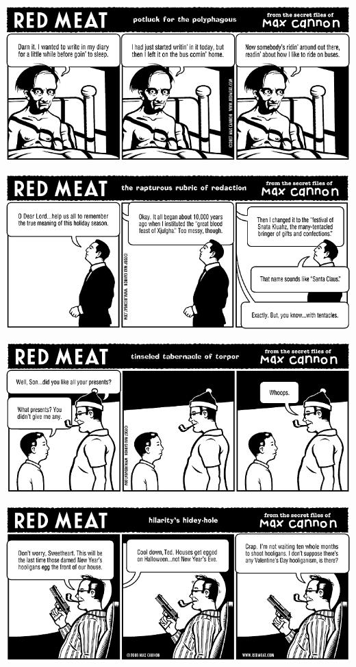 \documentclass[a4paper,twoside,11pt]{article}
\begin{document}
\includegraphics[width=\textwidth]{redmeat_2007-12-18.png}



\includegraphics[width=\textwidth]{redmeat_2007-12-25.png}



\includegraphics[width=\textwidth]{redmeat_2008-01-01.png}



\includegraphics[width=\textwidth]{redmeat_2008-01-08.png}
\end{document}
